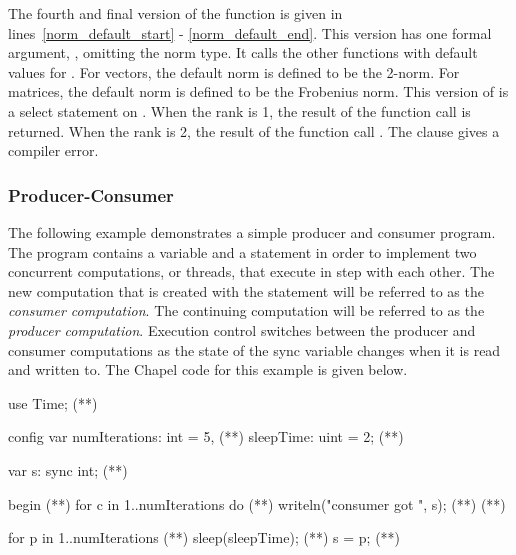 The fourth and final version of the  function is given in 
lines~\ref{norm_default_start} - \ref{norm_default_end}.
This version has one formal argument, , omitting the norm
type.  It calls the other  functions with default values for 
.  For vectors, the default norm is defined to be the 2-norm.
For matrices, the default norm is defined to be the Frobenius norm.  This 
version of  is a select statement on .  When the rank 
is 1, the result of the function call  is returned.  
When the rank is 2, the result of the function call . 
The  clause gives a compiler error.

\subsubsection{Producer-Consumer}
The following example demonstrates a simple producer and consumer program.
The program contains a  variable and a  statement 
in order to implement two concurrent computations, or threads, that execute 
in step with each other.
The new computation that is created with the  statement will 
be referred to as the {\em consumer computation}.  The continuing computation
will be referred to as the
{\em producer computation}.  Execution control switches between the
producer and consumer computations as the state of the sync variable  
changes when it is read and written to.  The Chapel code for this example is given below.

\begin{numberedchapel}
use Time;                           (*\label{use_time}*)

config var numIterations: int = 5,  (*\label{prodcons_var_1}*)
           sleepTime: uint = 2;     (*\label{prodcons_var_2}*)

var s: sync int;                    (*\label{prodcons_var_3}*)

begin {                                (*\label{consumer_start}*)
  for c in 1..numIterations do         (*\label{consumer_for_1}*)
    writeln("consumer got ", s);       (*\label{consumer_for_2}*)
}                                      (*\label{consumer_end}*)

for p in 1..numIterations {            (*\label{producer_start}*)
  sleep(sleepTime);   (*\label{sleep_call}*)
  s = p;
}                                      (*\label{producer_end}*)
\end{numberedchapel}

